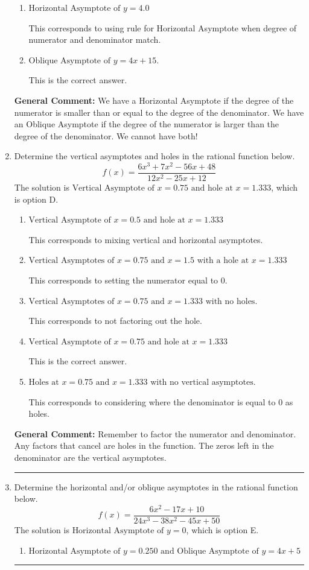 \documentclass{extbook}[14pt]
\newcommand{\litem}[1]{\item #1

\rule{\textwidth}{0.4pt}}
\begin{document}
\begin{enumerate}
{\begin{enumerate}[label=\Alph*.]
This corresponds to believing there can be both a horizontal and oblique asymptote.
\item \( \text{Horizontal Asymptote of } y = 4.0  \)

This corresponds to using rule for Horizontal Asymptote when degree of numerator and denominator match.
\item \( \text{Oblique Asymptote of } y = 4x + 15. \)

This is the correct answer.
\end{enumerate}

\textbf{General Comment:} We have a Horizontal Asymptote if the degree of the numerator is smaller than or equal to the degree of the denominator. We have an Oblique Asymptote if the degree of the numerator is larger than the degree of the denominator. We cannot have both!
}
\litem{
Determine the vertical asymptotes and holes in the rational function below.
\[ f(x) = \frac{6x^{3} +7 x^{2} -56 x + 48}{12x^{2} -25 x + 12} \]The solution is \( \text{Vertical Asymptote of } x = 0.75 \text{ and hole at } x = 1.333 \), which is option D.\begin{enumerate}[label=\Alph*.]
\item \( \text{Vertical Asymptote of } x = 0.5 \text{ and hole at } x = 1.333 \)

This corresponds to mixing vertical and horizontal asymptotes.
\item \( \text{Vertical Asymptotes of } x = 0.75 \text{ and } x = 1.5 \text{ with a hole at } x = 1.333 \)

This corresponds to setting the numerator equal to 0.
\item \( \text{Vertical Asymptotes of } x = 0.75 \text{ and } x = 1.333 \text{ with no holes.} \)

This corresponds to not factoring out the hole.
\item \( \text{Vertical Asymptote of } x = 0.75 \text{ and hole at } x = 1.333 \)

This is the correct answer.
\item \( \text{Holes at } x = 0.75 \text{ and } x = 1.333 \text{ with no vertical asymptotes.} \)

This corresponds to considering where the denominator is equal to 0 as holes.
\end{enumerate}

\textbf{General Comment:} Remember to factor the numerator and denominator. Any factors that cancel are holes in the function. The zeros left in the denominator are the vertical asymptotes.
}
\litem{
Determine the horizontal and/or oblique asymptotes in the rational function below.
\[ f(x) = \frac{6x^{2} -17 x + 10}{24x^{3} -38 x^{2} -45 x + 50} \]The solution is \( \text{Horizontal Asymptote of } y = 0 \), which is option E.\begin{enumerate}[label=\Alph*.]
\item \( \text{Horizontal Asymptote of } y = 0.250 \text{ and Oblique Asymptote of } y = 4x + 5 \)


\end{enumerate}}
\end{enumerate}
\end{document}
